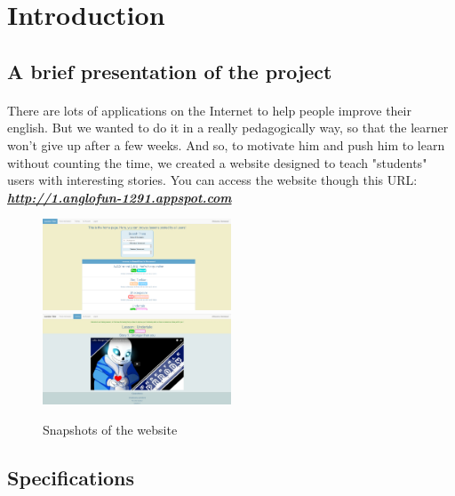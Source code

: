 \section{Introduction} %

\subsection{A brief presentation of the project}

\paragraph{}

There are lots of applications on the Internet to help people improve their english. But we wanted to do it in a really pedagogically way, so that the learner won't give up after a few weeks. And so, to motivate him and push him to learn without counting the time, we created a website designed to teach "students" users with interesting stories. \linebreak
You can access the website though this URL: \textbf{\emph{\url{http://1.anglofun-1291.appspot.com}}} \linebreak

\begin{figure}[!ht]
    \includegraphics[width=0.5\textwidth]{./images/snapshot1.png}
    \includegraphics[width=0.5\textwidth]{./images/snapshot2.jpg}
    \caption{Snapshots of the website}
\end{figure}

\subsection{Specifications}


